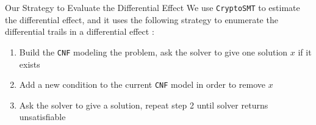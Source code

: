 \documentclass{beamer}
\begin{document}
\begin{frame}{Our Strategy to Evaluate the Differential Effect}
We use \texttt{CryptoSMT}\cite{CryptoSMT-ref} to estimate the differential effect, and it uses the following strategy to enumerate the differential trails in a differential effect \cite{liu2016automatic,kolbl2015observations}:
\vspace{5mm}
\begin{enumerate}
    \item Build the \texttt{CNF} modeling the problem, ask the solver to give one solution $x$ if it exists
    \vspace{3mm}
    \item Add a new condition to the current \texttt{CNF} model in order to remove $x$
    \vspace{3mm}
    \item Ask the solver to give a solution, repeat step 2 until solver returns unsatisfiable
\end{enumerate}

\end{frame}

\end{document}
